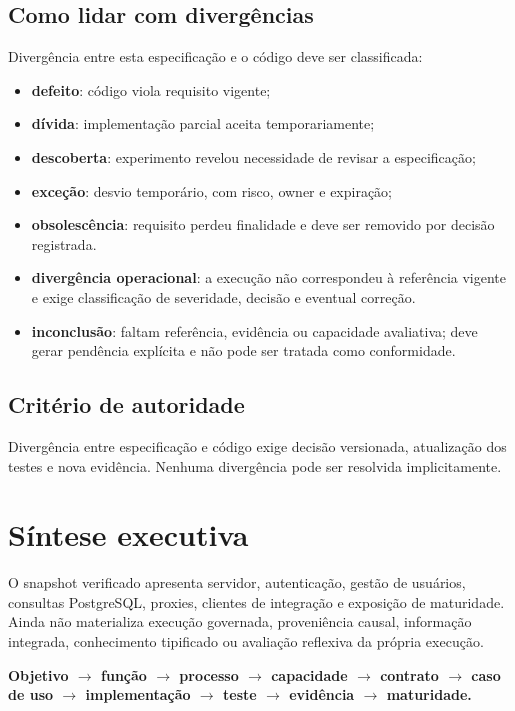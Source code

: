 \documentclass[11pt,a4paper,oneside]{article}
\begin{document}
\subsection{Como lidar com divergências}
Divergência entre esta especificação e o código deve ser classificada:
\begin{itemize}
  \item \textbf{defeito}: código viola requisito vigente;
  \item \textbf{dívida}: implementação parcial aceita temporariamente;
  \item \textbf{descoberta}: experimento revelou necessidade de revisar a especificação;
  \item \textbf{exceção}: desvio temporário, com risco, owner e expiração;
  \item \textbf{obsolescência}: requisito perdeu finalidade e deve ser removido por decisão registrada.
  \item \textbf{divergência operacional}: a execução não correspondeu à referência vigente e exige classificação de severidade, decisão e eventual correção.
  \item \textbf{inconclusão}: faltam referência, evidência ou capacidade avaliativa; deve gerar pendência explícita e não pode ser tratada como conformidade.
\end{itemize}

\subsection{Critério de autoridade}
Divergência entre especificação e código exige decisão versionada, atualização dos testes e nova evidência. Nenhuma divergência pode ser resolvida implicitamente.

\section{Síntese executiva}

O snapshot verificado apresenta servidor, autenticação, gestão de usuários, consultas PostgreSQL, proxies, clientes de integração e exposição de maturidade. Ainda não materializa execução governada, proveniência causal, informação integrada, conhecimento tipificado ou avaliação reflexiva da própria execução.

\begin{principio}
\centering
\textbf{Objetivo $\rightarrow$ função $\rightarrow$ processo $\rightarrow$ capacidade $\rightarrow$ contrato $\rightarrow$ caso de uso $\rightarrow$ implementação $\rightarrow$ teste $\rightarrow$ evidência $\rightarrow$ maturidade.}
\end{principio}
\end{document}
